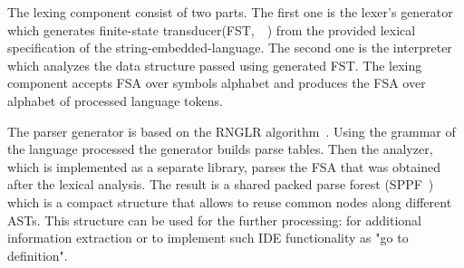 The lexing component consist of two parts. The first one is the lexer's generator which generates finite-state transducer(FST,~~\cite{FST:ref}) from the provided lexical specification of the string-embedded-language. The second one is the interpreter which analyzes the data structure passed using generated FST. The lexing component accepts FSA over symbols alphabet and produces the FSA over alphabet of processed language tokens.

The parser generator is based on the RNGLR algorithm~\cite{RNGLR:ref}. Using the grammar of the language processed the generator builds parse tables. Then the analyzer, which is implemented as a separate library, parses the FSA that was obtained after the lexical analysis. The result is a shared packed parse forest (SPPF~\cite{SPPF:ref}) which is a compact structure that allows to reuse common nodes along different ASTs. This structure can be used for the further processing: for additional information extraction or to implement such IDE functionality as "go to definition".